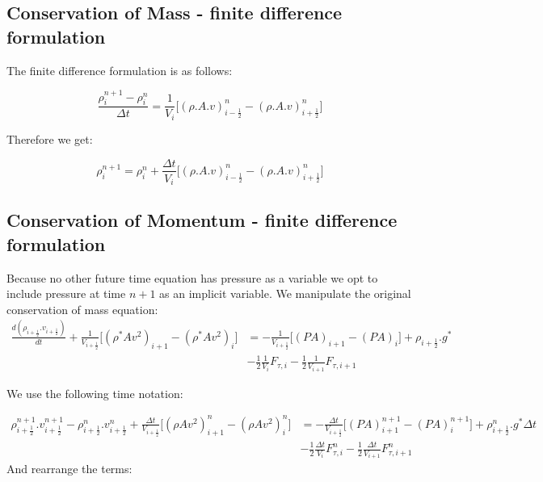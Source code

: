 \documentclass[11pt,letterpaper,titlepage]{article}
\newcommand{\half}{\frac{1}{2}}
\begin{document}
\subsection{Conservation of Mass - finite difference formulation}
The finite difference formulation is as follows:


\begin{equation*}
\frac{\rho_i^{n+1} - \rho_i^{n}}{\Delta t} = \frac{1}{V_i}\biggr[ (\rho.A.v)_{i-\half}^{n}-(\rho.A.v)_{i+\half}^{n} \biggr]
\end{equation*}

\noindent Therefore we get:

\begin{equation}
\rho_i^{n+1}  = \rho_i^{n}+\frac{\Delta t}{V_i}\biggr[ (\rho.A.v)_{i-\half}^{n}-(\rho.A.v)_{i+\half}^{n} \biggr]
\end{equation}




\subsection{Conservation of Momentum - finite difference formulation}
Because no other future time equation has pressure as a variable we opt to include pressure at time $n+1$ as an implicit variable. We manipulate the original conservation of mass equation:
\begin{equation*}
\begin{aligned}
\frac{d(\rho_{i+\half}.v_{i+\half})}{dt}+ \frac{1}{V_{i+\half}} \biggr[   (\rho^*Av^2)_{i+1} - (\rho^*Av^2)_{i} \biggr]      &=-\frac{1}{V_{i+\half}} \biggr[   (PA)_{i+1}-(PA)_{i}  \biggr] +\rho_{i+\half}.g^* \\
&-\half \frac{1}{V_i}F_{\tau,i}-\half \frac{1}{V_{i+1}}F_{\tau,i+1}
\end{aligned}
\end{equation*}

\noindent We use the following time notation:

\begin{equation*}
\begin{aligned}
\rho_{i+\half}^{n+1}.v_{i+\half}^{n+1}-\rho_{i+\half}^n.v_{i+\half}^n+ \frac{\Delta t}{V_{i+\half}} \biggr[   (\rho Av^2)_{i+1}^n - (\rho Av^2)_{i}^n \biggr]      &=-\frac{\Delta t}{V_{i+\half}} \biggr[   (PA)_{i+1}^{n+1}-(PA)_{i}^{n+1}  \biggr] +\rho_{i+\half}^n.g^*\Delta t \\
&-\half \frac{\Delta t}{V_i}F_{\tau,i}^n-\half \frac{\Delta t}{V_{i+1}}F_{\tau,i+1}^n
\end{aligned}
\end{equation*}
\newline
\noindent And rearrange the terms:
\end{document}
